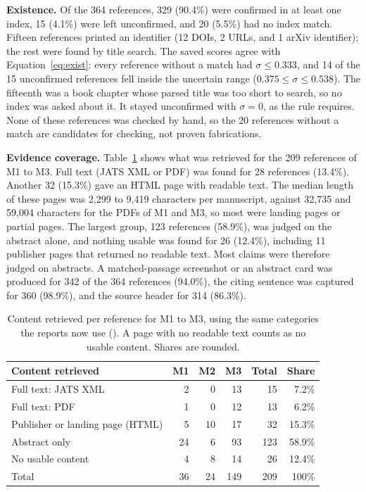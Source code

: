 \documentclass{article}
\newcommand{\vd}[1]{\texttt{\detokenize{#1}}}
\begin{document}
\textbf{Existence.} Of the 364 references, 329 (90.4\%) were confirmed in at least one index, 15 (4.1\%) were left unconfirmed, and 20 (5.5\%) had no index match. Fifteen references printed an identifier (12 DOIs, 2 URLs, and 1 arXiv identifier); the rest were found by title search. The saved scores agree with Equation~\eqref{eq:exist}: every reference without a match had $\sigma \le 0.333$, and 14 of the 15 unconfirmed references fell inside the uncertain range ($0.375 \le \sigma \le 0.538$). The fifteenth was a book chapter whose parsed title was too short to search, so no index was asked about it. It stayed unconfirmed with $\sigma = 0$, as the rule requires. None of these references was checked by hand, so the 20 references without a match are candidates for checking, not proven fabrications.

\textbf{Evidence coverage.} Table~\ref{tab:coverage} shows what was retrieved for the 209 references of M1 to M3. Full text (JATS XML or PDF) was found for 28 references (13.4\%). Another 32 (15.3\%) gave an HTML page with readable text. The median length of these pages was 2{,}299 to 9{,}419 characters per manuscript, against 32{,}735 and 59{,}004 characters for the PDFs of M1 and M3, so most were landing pages or partial pages. The largest group, 123 references (58.9\%), was judged on the abstract alone, and nothing usable was found for 26 (12.4\%), including 11 publisher pages that returned no readable text. Most claims were therefore judged on abstracts. A matched-passage screenshot or an abstract card was produced for 342 of the 364 references (94.0\%), the citing sentence was captured for 360 (98.9\%), and the source header for 314 (86.3\%).

\begin{table}[htbp]
\centering
\caption{Content retrieved per reference for M1 to M3, using the same categories the reports now use (\vd{pipeline.coverage_of}). A page with no readable text counts as no usable content. Shares are rounded.}
\label{tab:coverage}
\small
\begin{tabular}{@{}l r r r r r@{}}
\toprule
\textbf{Content retrieved} & \textbf{M1} & \textbf{M2} & \textbf{M3} & \textbf{Total} & \textbf{Share}\\
\midrule
Full text: JATS XML & 2 & 0 & 13 & 15 & 7.2\%\\
Full text: PDF & 1 & 0 & 12 & 13 & 6.2\%\\
Publisher or landing page (HTML) & 5 & 10 & 17 & 32 & 15.3\%\\
Abstract only & 24 & 6 & 93 & 123 & 58.9\%\\
No usable content & 4 & 8 & 14 & 26 & 12.4\%\\
\midrule
Total & 36 & 24 & 149 & 209 & 100\%\\
\bottomrule
\end{tabular}
\end{table}
\end{document}
